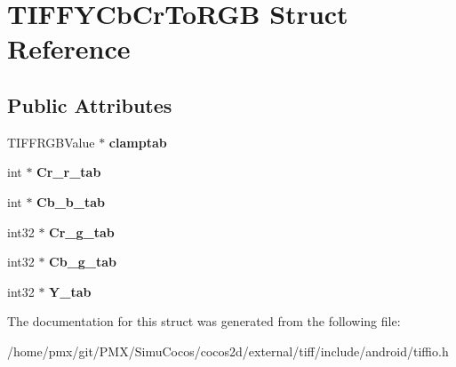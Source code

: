 \hypertarget{structTIFFYCbCrToRGB}{}\section{T\+I\+F\+F\+Y\+Cb\+Cr\+To\+R\+GB Struct Reference}
\label{structTIFFYCbCrToRGB}
\subsection*{Public Attributes}
\begin{DoxyCompactItemize}
\item 
\mbox{\label{structTIFFYCbCrToRGB_ac566770595bdd963b55a22241abdce5e}} 
T\+I\+F\+F\+R\+G\+B\+Value $\ast$ {\bfseries clamptab}
\item 
\mbox{\label{structTIFFYCbCrToRGB_a7d785413316214058725cdb2c5e877df}} 
int $\ast$ {\bfseries Cr\+\_\+r\+\_\+tab}
\item 
\mbox{\label{structTIFFYCbCrToRGB_a6deb710840f2cebd0dc82cae89fbb9be}} 
int $\ast$ {\bfseries Cb\+\_\+b\+\_\+tab}
\item 
\mbox{\label{structTIFFYCbCrToRGB_a9fc01d4b59378d2295df0ee669f4dd0b}} 
int32 $\ast$ {\bfseries Cr\+\_\+g\+\_\+tab}
\item 
\mbox{\label{structTIFFYCbCrToRGB_ab41699fcf743cbb58f66a81d8d96943e}} 
int32 $\ast$ {\bfseries Cb\+\_\+g\+\_\+tab}
\item 
\mbox{\label{structTIFFYCbCrToRGB_a13553b1730cdc4d6fb821558a178b3b6}} 
int32 $\ast$ {\bfseries Y\+\_\+tab}
\end{DoxyCompactItemize}


The documentation for this struct was generated from the following file\+:\begin{DoxyCompactItemize}
\item 
/home/pmx/git/\+P\+M\+X/\+Simu\+Cocos/cocos2d/external/tiff/include/android/tiffio.\+h\end{DoxyCompactItemize}
